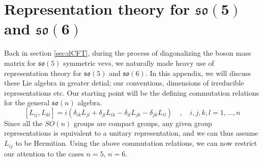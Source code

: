 %
\section{Representation theory for $\mathbf{\mathfrak{so}(5)}$ and $\mathbf{\mathfrak{so}(6)}$}\label{sec:so(5)_so(6)_rep_theory}
Back in section \ref{sec:dCFT}, during the process of diagonalizing the boson mass matrix for $\mathfrak{so}(5)$ symmetric vevs, we naturally made heavy use of representation theory for $\mathfrak{so}(5)$ and $\mathfrak{so}(6)$. In this appendix, we will discuss these Lie algebra in greater detial; our conventions, dimensions of irreducible representations etc. Our starting point will be the defining commutation relations for the general $\mathfrak{so}(n)$ algebra.
%
%
\begin{equation}\label{so(n) commutators}
[L_{ij}, L_{kl}] = i (
\delta_{ik} L_{jl}
+
\delta_{jl} L_{ik}
-
\delta_{il} L_{jk}
-
\delta_{jk} L_{il}
)
%
\quad , \quad
%
i,j,k,l = 1,\ldots,n
\end{equation}
%
%
Since all the $SO(n)$ groups are compact groups, any given group representations is equivalent to a unitary representation, and we can thus assume $L_{ij}$ to be Hermitian. Using the above commutation relations, we can now restrict our attention to the cases $n=5$, $n=6$.

